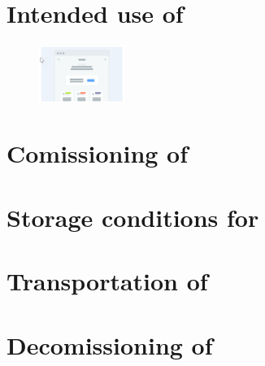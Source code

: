 \documentclass[oneside]{book}
\begin{document}
\chapter{Intended use of \productname}
\blindtext
\begin{figure}
	\centering
		\includegraphics[width=0.25\textwidth]{wireframe.png}
\end{figure}
\blindtext[4]
\chapter{Comissioning of \productname}
\blindtext[4]
\chapter{Storage conditions for \productname}
\blindtext[4]
\chapter{Transportation of \productname}
\blindtext[4]
\chapter{Decomissioning of \productname}
\blindtext[4]
\end{document}
